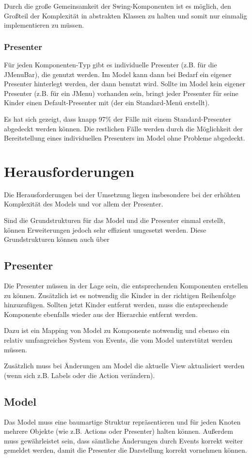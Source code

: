 \documentclass[oneside,a4paper]{scrartcl}
\begin{document}
Durch die große Gemeinsamkeit der Swing-Komponenten ist es möglich, den Großteil der Komplexität in abstrakten
Klassen zu halten und somit nur einmalig implementieren zu müssen.

\subsubsection{Presenter}
Für jeden Komponenten-Typ gibt es individuelle Presenter (z.B. für die JMenuBar), die genutzt werden. Im Model kann
dann bei Bedarf ein eigener Presenter hinterlegt werden, der dann benutzt wird. Sollte im Model kein eigener
Presenter (z.B. für ein JMenu) vorhanden sein, bringt jeder Presenter für seine Kinder einen Default-Presenter
mit (der ein Standard-Menü erstellt).

Es hat sich gezeigt, dass knapp 97\% der Fälle mit einem Standard-Presenter abgedeckt werden können. Die restlichen
Fälle werden durch die Möglichkeit der Bereitstellung eines individuellen Presenters im Model ohne Probleme
abgedeckt.




\section{Herausforderungen}
Die Herausforderungen bei der Umsetzung liegen insbesondere bei der erhöhten Komplexität des Models und vor allem
der Presenter.

Sind die Grundstrukturen für das Model und die Presenter einmal erstellt, können Erweiterungen jedoch sehr effizient
umgesetzt werden. Diese Grundstrukturen können auch über 

\subsection{Presenter}
Die Presenter müssen in der Lage sein, die entsprechenden Komponenten erstellen zu können. Zusätzlich ist es notwendig
die Kinder in der richtigen Reihenfolge hinzuzufügen. Sollten jetzt Kinder entfernt werden, muss die entsprechende
Komponente ebenfalls wieder aus der Hierarchie entfernt werden.

Dazu ist ein Mapping von Model zu Komponente notwendig und ebenso ein relativ umfangreiches System von Events, die vom
Model unterstützt werden müssen.

Zusätzlich muss bei Änderungen am Model die aktuelle View aktualisiert werden (wenn sich z.B. Labels oder die
Action verändern).

\subsection{Model}
Das Model muss eine baumartige Struktur repräsentieren und für jeden Knoten mehrere Objekte (wie z.B. Actions oder
Presenter) halten können. Außerdem muss gewährleistet sein, dass sämtliche Änderungen durch Events korrekt weiter
gemeldet werden, damit die Presenter die Darstellung korrekt vornehmen können.
\end{document}
